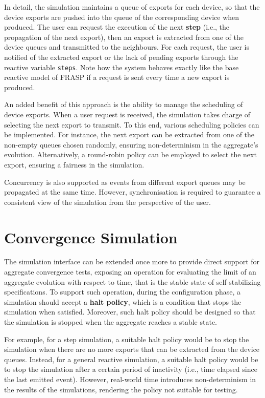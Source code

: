 In detail, the simulation maintains a queue of exports for each device, so that
the device exports are pushed into the queue of the corresponding device when
produced. The user can request the execution of the next \textbf{step} (i.e.,
the propagation of the next export), then an export is extracted from one of
the device queues and transmitted to the neighbours. For each request, the user
is notified of the extracted export or the lack of pending exports through the
reactive variable \texttt{steps}. Note how the system behaves exactly like the
base reactive model of FRASP if a request is sent every time a new export is
produced.

An added benefit of this approach is the ability to manage the scheduling of
device exports. When a user request is received, the simulation takes charge of
selecting the next export to transmit. To this end, various scheduling policies
can be implemented. For instance, the next export can be extracted from one of
the non-empty queues chosen randomly, ensuring non-determinism in the
aggregate's evolution. Alternatively, a round-robin policy can be employed to
select the next export, ensuring a fairness in the simulation.

Concurrency is also supported as events from different export queues may be
propagated at the same time. However, synchronisation is required to guarantee
a consistent view of the simulation from the perspective of the user.

\section{Convergence Simulation}
\label{section:design:convergence-simulation}

The simulation interface can be extended once more to provide direct support
for aggregate convergence tests, exposing an operation for evaluating the limit
of an aggregate evolution with respect to time, that is the stable state of
self-stabilizing specifications. To support such operation, during the
configuration phase, a simulation should accept a \textbf{halt policy}, which
is a condition that stops the simulation when satisfied. Moreover, such halt
policy should be designed so that the simulation is stopped when the aggregate
reaches a stable state.

For example, for a step simulation, a suitable halt policy would be to stop the
simulation when there are no more exports that can be extracted from the device
queues. Instead, for a general reactive simulation, a suitable halt policy
would be to stop the simulation after a certain period of inactivity (i.e.,
time elapsed since the last emitted event). However, real-world time introduces
non-determinism in the results of the simulations, rendering the policy not
suitable for testing.

